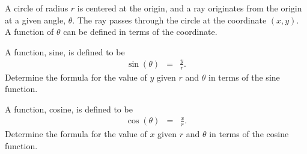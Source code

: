 
\begin{problem}
\item A circle of radius $r$ is centered at the origin, and a ray
  originates from the origin at a given angle, $\theta$. The ray
  passes through the circle at the coordinate $(x,y)$. A function of
  $\theta$ can be defined in terms of the coordinate.



  \begin{subproblem}
  \item A function, sine, is defined to be
    \begin{eqnarray*}
      \sin(\theta) & = & \frac{y}{r}.
    \end{eqnarray*}
    Determine the formula for the value of $y$ given $r$ and $\theta$
    in terms of the sine function.
    \vfill
  \item A function, cosine, is defined to be
    \begin{eqnarray*}
      \cos(\theta) & = & \frac{x}{r}.
    \end{eqnarray*}
    Determine the formula for the value of $x$ given $r$ and $\theta$
    in terms of the cosine function.
    \vfill
  \end{subproblem}

\end{problem}


